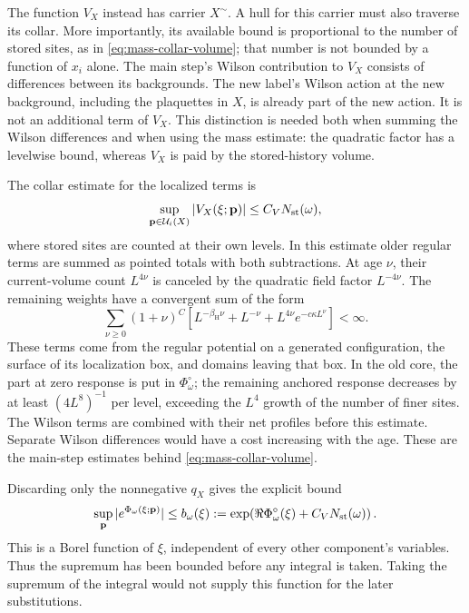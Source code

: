 \documentclass[11pt,letterpaper,reqno]{amsart}
\theoremstyle{definition}
\theoremstyle{remark}
\begin{document}
The function \(V_X\) instead has carrier \(X^\sim\). A hull for
this carrier must also traverse its collar. More importantly, its
available bound is proportional to the number of stored sites,
as in \eqref{eq:mass-collar-volume}; that number is not bounded
by a function of \(x_i\) alone. The main step's Wilson contribution
to \(V_X\) consists of differences between its backgrounds. The
new label's Wilson action at the new background, including the
plaquettes in \(X\), is already part of the new action. It is not
an additional term of \(V_X\). This distinction is needed both
when summing the Wilson differences and when using the mass
estimate: the quadratic factor has a levelwise bound, whereas
\(V_X\) is paid by the stored-history volume.


The collar estimate for the localized terms is
\begin{equation}\label{eq:mass-collar-volume}
 \sup_{\mathbf p\in\mathcal U_i(X)}|V_X(\xi;\mathbf p)|
                      \le C_V N_{\rm st}(\omega),
\end{equation}
where stored sites are counted at their own levels.
In this estimate older regular terms are summed as pointed totals
with both subtractions. At age \(\nu\), their current-volume count
\(L^{4\nu}\) is canceled by the quadratic field factor
\(L^{-4\nu}\). The remaining weights have a convergent sum of the
form
\[
 \sum_{\nu\ge0}(1+\nu)^C
 \left[L^{-\beta_{\mathrm H}\nu}
             +L^{-\nu}+L^{4\nu}e^{-c\kappa L^\nu}\right]<\infty.
\]
These terms come from the regular potential on a generated
configuration, the surface of its localization box, and domains
leaving that box. In the old core, the part at zero response is
put in \(\Phi_\omega^\circ\); the remaining anchored response
decreases by at least \((4L^8)^{-1}\) per level, exceeding the
\(L^4\) growth of the number of finer sites. The Wilson terms are
combined with their net profiles before this estimate. Separate
Wilson differences would have a cost increasing with the age.
These are the main-step estimates behind
\eqref{eq:mass-collar-volume}.

Discarding only the nonnegative \(q_X\) gives the explicit bound
\[
 \sup_{\mathbf p}|e^{\Phi_\omega(\xi;\mathbf p)}|
 \le b_\omega(\xi)
 :=\exp\!\left(\Re\Phi_\omega^\circ(\xi)
                              +C_VN_{\rm st}(\omega)\right).
\]
This is a Borel function of \(\xi\), independent of every other
component's variables. Thus the supremum has been bounded before
any integral is taken. Taking the supremum of the integral would
not supply this function for the later substitutions.
\end{document}
